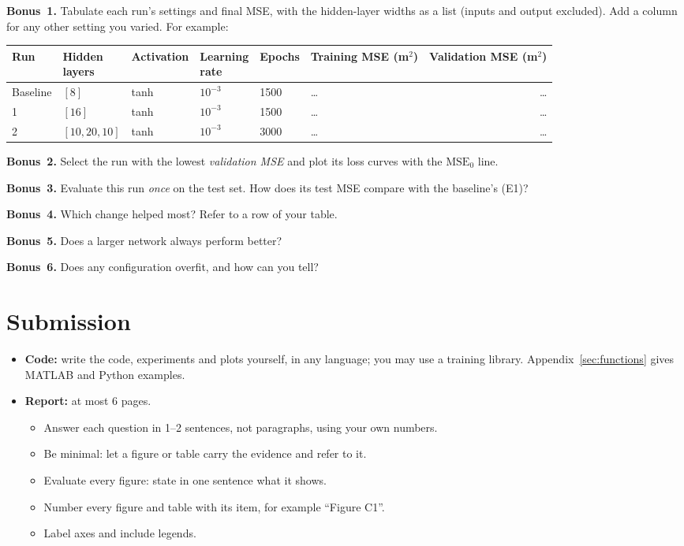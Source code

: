 \documentclass[11pt]{article}
\newcommand{\question}[2]{\par\noindent\textbf{#1.} #2\par}
\begin{document}
\question{Bonus~1}{Tabulate each run's settings and final MSE, with the hidden-layer widths as a list (inputs and output excluded). Add a column for any other setting you varied. For example:}
\begin{center}
\small
\begin{tabular}{@{}llllllr@{}}
\toprule
Run & \shortstack[l]{Hidden\\layers} & Activation & \shortstack[l]{Learning\\rate} & Epochs & \shortstack[r]{Training MSE\\(m$^2$)} & \shortstack[r]{Validation MSE\\(m$^2$)} \\
\midrule
Baseline & $[8]$ & tanh & $10^{-3}$ & 1500 & \dots & \dots \\
1 & $[16]$ & tanh & $10^{-3}$ & 1500 & \dots & \dots \\
2 & $[10, 20, 10]$ & tanh & $10^{-3}$ & 3000 & \dots & \dots \\
\bottomrule
\end{tabular}
\end{center}
\question{Bonus~2}{Select the run with the lowest \emph{validation MSE} and plot its loss curves with the $\mathrm{MSE}_0$ line.}
\question{Bonus~3}{Evaluate this run \emph{once} on the test set. How does its test MSE compare with the baseline's (E1)?}

\question{Bonus~4}{Which change helped most? Refer to a row of your table.}
\question{Bonus~5}{Does a larger network always perform better?}
\question{Bonus~6}{Does any configuration overfit, and how can you tell?}

\section*{Submission}
\begin{itemize}
  \item \aitrap \textbf{Code:} write the code, experiments and plots yourself, in any language; you may use a training library. Appendix~\ref{sec:functions} gives MATLAB and Python examples.
  \item \textbf{Report:} at most 6 pages.
  \begin{itemize}
    \item Answer each question in 1--2 sentences, not paragraphs, using your own numbers.
    \item Be minimal: let a figure or table carry the evidence and refer to it.
    \item Evaluate every figure: state in one sentence what it shows.
    \item Number every figure and table with its item, for example ``Figure C1''.
    \item Label axes and include legends.
  \end{itemize}
\end{itemize}
\end{document}
